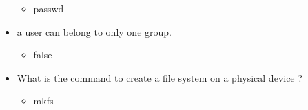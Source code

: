 \documentclass{report}
\begin{document}
\begin{itemize}
            \begin{itemize}
                \item passwd
            \end{itemize}
        \item a user can belong to only one group.
            \begin{itemize}
                \item false
            \end{itemize}
        \item What is the command to create a file system on a physical device ?
            \begin{itemize}
                \item mkfs
            \end{itemize}
    \end{itemize}
   
\end{document}
